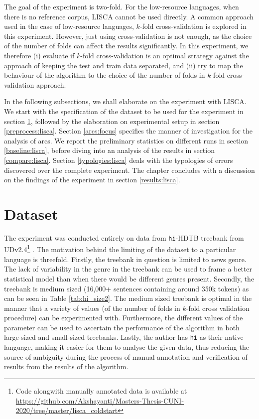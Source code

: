 The goal of the experiment is two-fold. For the low-resource languages, when there is no reference corpus, LISCA cannot be used directly. A common approach used in the case of low-resource languages, \(k\)-fold cross-validation is explored in this experiment. However, just using cross-validation is not enough, as the choice of the number of folds can affect the results significantly. In this experiment, we therefore (i) evaluate if \(k\)-fold cross-validation is an optimal strategy against the approach of keeping the test and train data separated, and (ii) try to map the behaviour of the algorithm to the choice of the number of folds in \(k\)-fold cross-validation approach.

In the following subsections, we shall elaborate on the experiment with LISCA. We start with the specification of the dataset to be used for the experiment in section \ref{data:lisca}, followed by the elaboration on experimental setup in section \ref{preprocess:lisca}. Section \ref{arcs:focus} specifies the manner of investigation for the analysis of arcs. We report the preliminary statistics on different runs in section \ref{baseline:lisca}, before diving into an analysis of the results in section \ref{compare:lisca}. Section \ref{typologies:lisca} deals with the typologies of errors discovered over the complete experiment. The chapter concludes with a discussion on the findings of the experiment in section \ref{results:lisca}.

\section{Dataset}
\label{data:lisca}

The experiment was conducted entirely on data from \verb|hi|-HDTB treebank from UDv2.4\footnote{Code alongwith manually annotated data is available at \url{https://github.com/Akshayanti/Masters-Thesis-CUNI-2020/tree/master/lisca_coldstart}} \citep{UDv2.4}. The motivation behind the limiting of the dataset to a particular language is threefold. Firstly, the treebank in question is limited to news genre. The lack of variability in the genre in the treebank can be used to frame a better statistical model than when there would be different genres present. Secondly, the treebank is medium sized (16,000+ sentences containing around 350k tokens) as can be seen in Table \ref{tab:hi_size2}. The medium sized treebank is optimal in the manner that a variety of values (of the number of folds in \(k\)-fold cross validation procedure) can be experimented with. Furthermore, the different values of the parameter can be used to ascertain the performance of the algorithm in both large-sized and small-sized treebanks. Lastly, the author has \verb|hi| as their native language, making it easier for them to analyse the given data, thus reducing the source of ambiguity during the process of manual annotation and verification of results from the results of the algorithm.

